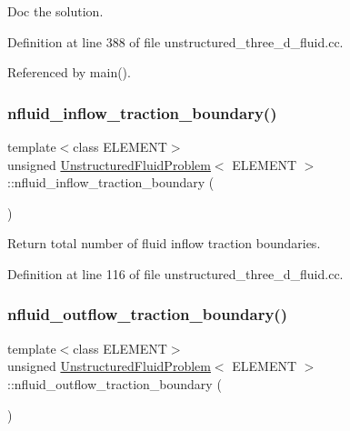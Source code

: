 Doc the solution. 



Definition at line 388 of file unstructured\+\_\+three\+\_\+d\+\_\+fluid.\+cc.



Referenced by main().

\mbox{\label{classUnstructuredFluidProblem_a8afc18327561107094fa94f2918a385f}} 
\subsubsection{\texorpdfstring{nfluid\+\_\+inflow\+\_\+traction\+\_\+boundary()}{nfluid\_inflow\_traction\_boundary()}}
{\footnotesize\ttfamily template$<$class E\+L\+E\+M\+E\+NT$>$ \\
unsigned \hyperlink{classUnstructuredFluidProblem}{Unstructured\+Fluid\+Problem}$<$ E\+L\+E\+M\+E\+NT $>$\+::nfluid\+\_\+inflow\+\_\+traction\+\_\+boundary (\begin{DoxyParamCaption}{ }\end{DoxyParamCaption})\hspace{0.3cm}{\ttfamily [inline]}}



Return total number of fluid inflow traction boundaries. 



Definition at line 116 of file unstructured\+\_\+three\+\_\+d\+\_\+fluid.\+cc.

\mbox{\label{classUnstructuredFluidProblem_abcaa700f2e0e1b2097e7dc25fe087862}} 
\subsubsection{\texorpdfstring{nfluid\+\_\+outflow\+\_\+traction\+\_\+boundary()}{nfluid\_outflow\_traction\_boundary()}}
{\footnotesize\ttfamily template$<$class E\+L\+E\+M\+E\+NT$>$ \\
unsigned \hyperlink{classUnstructuredFluidProblem}{Unstructured\+Fluid\+Problem}$<$ E\+L\+E\+M\+E\+NT $>$\+::nfluid\+\_\+outflow\+\_\+traction\+\_\+boundary (\begin{DoxyParamCaption}{ }\end{DoxyParamCaption})\hspace{0.3cm}{\ttfamily [inline]}}



